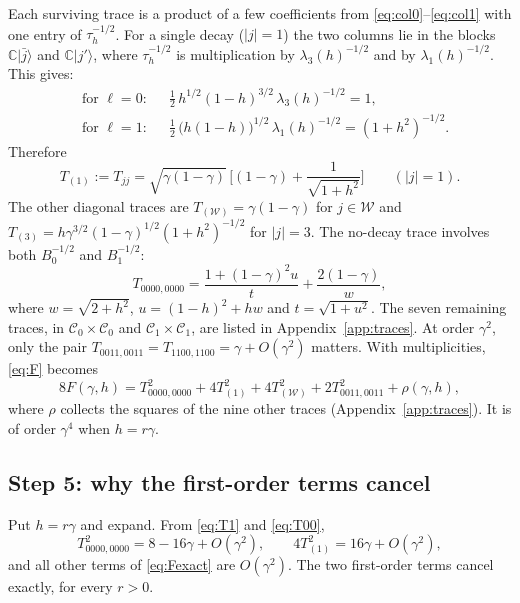 \documentclass[11pt,a4paper]{article}
\theoremstyle{plain}
\newcommand{\ket}[1]{\lvert #1\rangle}
\newcommand{\C}{\mathbb{C}}
\newcommand{\cC}{\mathcal{C}}
\newcommand{\cW}{\mathcal{W}}
\newcommand{\wt}[1]{\lvert #1\rvert}
\begin{document}
Each surviving trace is a product of a few coefficients from \eqref{eq:col0}--\eqref{eq:col1} with one entry of $\tau_h^{-1/2}$. For a single decay ($\wt{j}=1$) the two columns lie in the blocks $\C\ket{\bar j}$ and $\C\ket{j'}$, where $\tau_h^{-1/2}$ is multiplication by $\lambda_3(h)^{-1/2}$ and by $\lambda_1(h)^{-1/2}$. This gives:
\begin{equation}\label{eq:cancel}
\begin{aligned}
&\text{for $\ell=0$:} && \tfrac12\,h^{1/2}(1-h)^{3/2}\,\lambda_3(h)^{-1/2}=1,\\
&\text{for $\ell=1$:} && \tfrac12\,\big(h(1-h)\big)^{1/2}\,\lambda_1(h)^{-1/2}=(1+h^2)^{-1/2}.
\end{aligned}
\end{equation}
Therefore
\begin{equation}\label{eq:T1}
T_{(1)}:=T_{jj}=\sqrt{\gamma(1-\gamma)}\,\Big[(1-\gamma)+\frac1{\sqrt{1+h^2}}\Big]\qquad(\wt{j}=1).
\end{equation}
The other diagonal traces are $T_{(\cW)}=\gamma(1-\gamma)$ for $j\in\cW$ and $T_{(3)}=h\gamma^{3/2}(1-\gamma)^{1/2}(1+h^2)^{-1/2}$ for $\wt{j}=3$. The no-decay trace involves both $B_0^{-1/2}$ and $B_1^{-1/2}$:
\begin{equation}\label{eq:T00}
T_{0000,0000}=\frac{1+(1-\gamma)^2u}{t}+\frac{2(1-\gamma)}w,
\end{equation}
where $w=\sqrt{2+h^2}$, $u=(1-h)^2+hw$ and $t=\sqrt{1+u^2}$.
The seven remaining traces, in $\cC_0\times\cC_0$ and $\cC_1\times\cC_1$, are listed in Appendix~\ref{app:traces}. At order $\gamma^2$, only the pair $T_{0011,0011}=T_{1100,1100}=\gamma+O(\gamma^2)$ matters. With multiplicities, \eqref{eq:F} becomes
\begin{equation}\label{eq:Fexact}
8F(\gamma,h)=T_{0000,0000}^2+4T_{(1)}^2+4T_{(\cW)}^2+2T_{0011,0011}^2+\rho(\gamma,h),
\end{equation}
where $\rho$ collects the squares of the nine other traces (Appendix~\ref{app:traces}). It is of order $\gamma^4$ when $h=r\gamma$.

\subsection*{Step 5: why the first-order terms cancel}

Put $h=r\gamma$ and expand. From \eqref{eq:T1} and \eqref{eq:T00},
\[
T_{0000,0000}^2=8-16\gamma+O(\gamma^2),\qquad 4T_{(1)}^2=16\gamma+O(\gamma^2),
\]
and all other terms of \eqref{eq:Fexact} are $O(\gamma^2)$. The two first-order terms cancel exactly, for every $r>0$.
\end{document}
